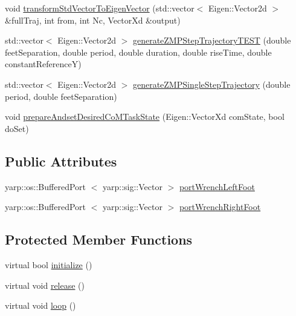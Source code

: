\begin{DoxyCompactItemize}
\item 
void \hyperlink{classWalkingClient_ab4148804702e065310a903112bc10162}{transform\-Std\-Vector\-To\-Eigen\-Vector} (std\-::vector$<$ \-Eigen\-::\-Vector2d $>$ \&full\-Traj, int from, int \-Nc, \-Vector\-Xd \&output)
\item 
std\-::vector$<$ \-Eigen\-::\-Vector2d $>$ \hyperlink{classWalkingClient_a70b2375134ae55a041fbf30180ea3a8f}{generate\-Z\-M\-P\-Step\-Trajectory\-T\-E\-S\-T} (double feet\-Separation, double period, double duration, double rise\-Time, double constant\-Reference\-Y)
\item 
std\-::vector$<$ \-Eigen\-::\-Vector2d $>$ \hyperlink{classWalkingClient_ab5bd1eceec03d8b88ffe2b6b07d981c0}{generate\-Z\-M\-P\-Single\-Step\-Trajectory} (double period, double feet\-Separation)
\item 
void \hyperlink{classWalkingClient_aad39a3836319f9b7258d8eb129776b47}{prepare\-Andset\-Desired\-Co\-M\-Task\-State} (\-Eigen\-::\-Vector\-Xd com\-State, bool do\-Set)
\end{DoxyCompactItemize}
\subsection*{\-Public \-Attributes}
\begin{DoxyCompactItemize}
\item 
yarp\-::os\-::\-Buffered\-Port\*
$<$ yarp\-::sig\-::\-Vector $>$ \hyperlink{classWalkingClient_a88ee63ff6a341eccd458d24700383457}{port\-Wrench\-Left\-Foot}
\item 
yarp\-::os\-::\-Buffered\-Port\*
$<$ yarp\-::sig\-::\-Vector $>$ \hyperlink{classWalkingClient_a96321dc60e84c193f2dea6e85983ca67}{port\-Wrench\-Right\-Foot}
\end{DoxyCompactItemize}
\subsection*{\-Protected \-Member \-Functions}
\begin{DoxyCompactItemize}
\item 
virtual bool \hyperlink{classWalkingClient_aba6a03fe29a4e947bc6bc0c09a713b2a}{initialize} ()
\item 
virtual void \hyperlink{classWalkingClient_a3b36da9d7649865a13c9318dd73ebc7e}{release} ()
\item 
virtual void \hyperlink{classWalkingClient_afd997bb00534c57fe1b0d5f37f207386}{loop} ()
\end{DoxyCompactItemize}
